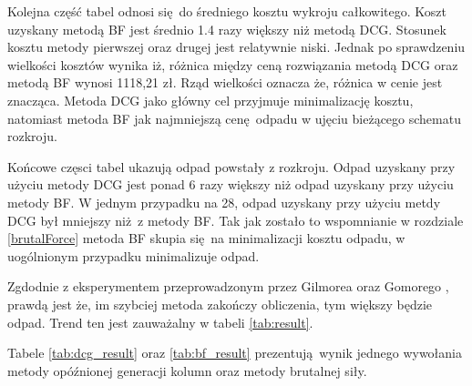 Kolejna część tabel odnosi się do średniego kosztu wykroju całkowitego. Koszt uzyskany metodą BF jest średnio 1.4 razy większy niż metodą DCG. Stosunek kosztu metody pierwszej oraz drugej jest relatywnie niski. Jednak po sprawdzeniu wielkości kosztów wynika iż, różnica między ceną rozwiązania metodą DCG oraz metodą BF wynosi 1118,21 zł. Rząd wielkości oznacza że, różnica w cenie jest znacząca. Metoda DCG jako główny cel przyjmuje minimalizację kosztu, natomiast metoda BF jak najmniejszą cenę odpadu w ujęciu bieżącego schematu rozkroju.

Końcowe częsci tabel ukazują odpad powstały z rozkroju. Odpad uzyskany przy użyciu metody DCG jest ponad 6 razy większy niż odpad uzyskany przy użyciu metody BF. W jednym przypadku na 28, odpad uzyskany przy użyciu metdy DCG był mniejszy niż z metody BF. Tak jak zostało to wspomnianie w rozdziale \ref{brutalForce} metoda BF skupia się na minimalizacji kosztu odpadu, w uogólnionym przypadku minimalizuje odpad.   

Zgdodnie z eksperymentem przeprowadzonym przez Gilmorea oraz Gomorego \cite{GilmoreGomoryV2Article}, prawdą jest że, im szybciej metoda zakończy obliczenia, tym większy będzie odpad. Trend ten jest zauważalny w tabeli \ref{tab:result}.

Tabele \ref{tab:dcg_result} oraz \ref{tab:bf_result} prezentują wynik jednego wywołania metody opóźnionej generacji kolumn oraz metody brutalnej siły.

